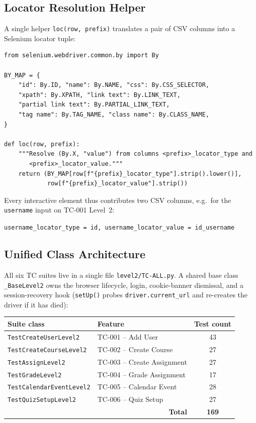 \documentclass[twoside,final]{hcmut-report}
\begin{document}
\subsection{Locator Resolution Helper}
A single helper \texttt{loc(row, prefix)} translates a pair of CSV columns into a Selenium locator tuple:

\begin{lstlisting}[caption={Locator resolution from CSV},label={lst:loc-helper}]
from selenium.webdriver.common.by import By

BY_MAP = {
    "id": By.ID, "name": By.NAME, "css": By.CSS_SELECTOR,
    "xpath": By.XPATH, "link text": By.LINK_TEXT,
    "partial link text": By.PARTIAL_LINK_TEXT,
    "tag name": By.TAG_NAME, "class name": By.CLASS_NAME,
}

def loc(row, prefix):
    """Resolve (By.X, "value") from columns <prefix>_locator_type and
       <prefix>_locator_value."""
    return (BY_MAP[row[f"{prefix}_locator_type"].strip().lower()],
            row[f"{prefix}_locator_value"].strip())
\end{lstlisting}

Every interactive element thus contributes two CSV columns, e.g.\ for the \texttt{username} input on TC-001 Level~2:
\begin{center}
    \texttt{username\_locator\_type = id, \quad username\_locator\_value = id\_username}
\end{center}

\subsection{Unified Class Architecture}
All six TC suites live in a single file \texttt{level2/TC-ALL.py}. A shared base class \texttt{\_BaseLevel2} owns the browser lifecycle, login, cookie-banner dismissal, and a session-recovery hook (\texttt{setUp()} probes \texttt{driver.current\_url} and re-creates the driver if it has died):

\begin{center}
\renewcommand{\arraystretch}{1.3}
\begin{tabular}{|l|l|c|}
\hline
\textbf{Suite class} & \textbf{Feature} & \textbf{Test count} \\ \hline
\texttt{TestCreateUserLevel2} & TC-001 -- Add User & 43 \\ \hline
\texttt{TestCreateCourseLevel2} & TC-002 -- Create Course & 27 \\ \hline
\texttt{TestAssignLevel2} & TC-003 -- Create Assignment & 27 \\ \hline
\texttt{TestGradeLevel2} & TC-004 -- Grade Assignment & 17 \\ \hline
\texttt{TestCalendarEventLevel2} & TC-005 -- Calendar Event & 28 \\ \hline
\texttt{TestQuizSetupLevel2} & TC-006 -- Quiz Setup & 27 \\ \hline
\multicolumn{2}{|r|}{\textbf{Total}} & \textbf{169} \\ \hline
\end{tabular}
\end{center}
\end{document}
